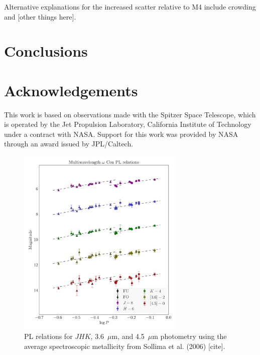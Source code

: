 \documentclass[a4paper,fleqn,usenatbib]{mnras}
\begin{document}
Alternative explanations for the increased scatter relative to M4 include crowding and [other things here].


\section{Conclusions}
\label{sec:conclusions}


\section*{Acknowledgements}
\label{sec:acknowledgements}
This work is based on observations made with the Spitzer Space Telescope, which is operated by the Jet Propulsion Laboratory, California Institute of Technology under a contract with NASA. Support for this work was provided by NASA through an award issued by JPL/Caltech.












\begin{figure}
\begin{center}
\includegraphics[width=80mm]{final_plots/multiwavelength_PL_samestars_spect.pdf}
\caption{PL relations for $J\!H\!K$, 3.6~$\mu$m, and 4.5~$\mu$m photometry using the average spectroscopic metallicity from Sollima et al. (2006) [cite].}
\label{fig:omegaCen_pl_spect}
\end{center}
\end{figure}
\end{document}
